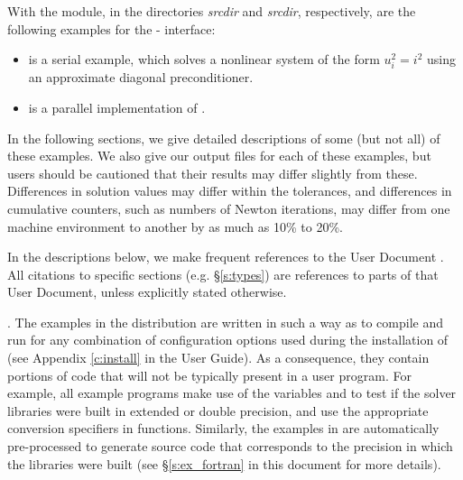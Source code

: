 \vspace{0.2in}\noindent
With the {\fkinsol} module, in the directories 
{\em srcdir} and
{\em srcdir}, respectively, are the
following examples for the {\F}-{\C} interface:
\begin{itemize}
\item {}
  is a serial example, which solves a nonlinear system of the form
  $u_i^2 = i^2$ using an approximate diagonal preconditioner.
\item {}
  is a parallel implementation of .
\end{itemize}

\vspace{0.2in}\noindent 
In the following sections, we give detailed descriptions of some (but
not all) of these examples.  We also give our output files for
each of these examples, but users should be cautioned that their
results may differ slightly from these.  Differences in solution
values may differ within the tolerances, and differences in cumulative
counters, such as numbers of Newton iterations, may differ
from one machine environment to another by as much as 10\% to 20\%.

In the descriptions below, we make frequent references to the {\kinsol}
User Document \cite{kinsol_ug}.  All citations to specific sections
(e.g. \S\ref{s:types}) are references to parts of that User Document, unless
explicitly stated otherwise.

\vspace{0.2in}. 
The examples in the {\kinsol} distribution are written in such a way as
to compile and run for any combination of configuration options used during
the installation of {\sundials} (see Appendix \ref{c:install} in the User Guide).
As a consequence, they contain portions of code that will not be typically present in a
user program. For example, all {\C} example programs make use of the
variables  and 
to test if the solver libraries were built in extended or double precision, 
and use the appropriate conversion specifiers in  functions.
Similarly, the {\F} examples in {\fkinsol} are automatically
pre-processed to generate source code that corresponds to the
precision in which the {\kinsol} libraries were built (see
\S\ref{s:ex_fortran} in this document for more details).

